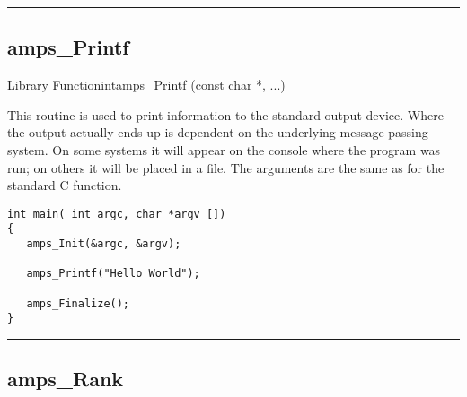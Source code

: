 
\noindent\rule{\textwidth}{1mm}

\subsection{amps\_Printf}
\label{amps_Printf}


\begin{deftypefn}{Library Function}{int}{amps\_Printf}
                 (const char *, ...)

\DESCRIPTION

This routine is used to print information to the standard output device.
Where the output actually ends up is dependent on the underlying message
passing system.  On some systems it will appear on the console where the
program was run; on others it will be placed in a file.  The arguments
are the same as for the standard C  function.

\EXAMPLE
\begin{display}\begin{verbatim}
int main( int argc, char *argv [])
{
   amps_Init(&argc, &argv);

   amps_Printf("Hello World");

   amps_Finalize();
}
\end{verbatim}\end{display}

\end{deftypefn}


\noindent\rule{\textwidth}{1mm}

\subsection{amps\_Rank}
\label{amps_Rank}



